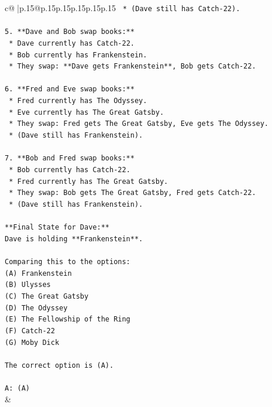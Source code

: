 \documentclass{article}
\begin{document}
{\begin{supertabular}{c@{$\;$}|p{.15\linewidth}@{}p{.15\linewidth}p{.15\linewidth}p{.15\linewidth}p{.15\linewidth}p{.15\linewidth}}
{{{\texttt{    *   (Dave still has Catch{-}22).} \\
\\ 
\texttt{5.  **Dave and Bob swap books:**} \\
\texttt{    *   Dave currently has Catch{-}22.} \\
\texttt{    *   Bob currently has Frankenstein.} \\
\texttt{    *   They swap: **Dave gets Frankenstein**, Bob gets Catch{-}22.} \\
\\ 
\texttt{6.  **Fred and Eve swap books:**} \\
\texttt{    *   Fred currently has The Odyssey.} \\
\texttt{    *   Eve currently has The Great Gatsby.} \\
\texttt{    *   They swap: Fred gets The Great Gatsby, Eve gets The Odyssey.} \\
\texttt{    *   (Dave still has Frankenstein).} \\
\\ 
\texttt{7.  **Bob and Fred swap books:**} \\
\texttt{    *   Bob currently has Catch{-}22.} \\
\texttt{    *   Fred currently has The Great Gatsby.} \\
\texttt{    *   They swap: Bob gets The Great Gatsby, Fred gets Catch{-}22.} \\
\texttt{    *   (Dave still has Frankenstein).} \\
\\ 
\texttt{**Final State for Dave:**} \\
\texttt{Dave is holding **Frankenstein**.} \\
\\ 
\texttt{Comparing this to the options:} \\
\texttt{(A) Frankenstein} \\
\texttt{(B) Ulysses} \\
\texttt{(C) The Great Gatsby} \\
\texttt{(D) The Odyssey} \\
\texttt{(E) The Fellowship of the Ring} \\
\texttt{(F) Catch{-}22} \\
\texttt{(G) Moby Dick} \\
\\ 
\texttt{The correct option is (A).} \\
\\ 
\texttt{A: (A)} \\
            }
        }
    }
    & \\ \\


\end{supertabular}}
\end{document}
